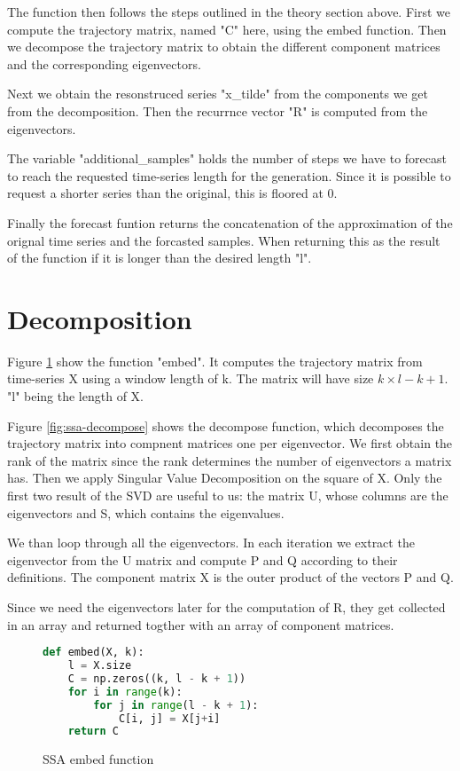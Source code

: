 The function then follows the steps outlined in the theory section above. First we compute the trajectory matrix, named "C" here, using the embed function. Then we decompose the trajectory matrix to obtain the different component matrices and the corresponding eigenvectors. 

Next we obtain the resonstruced series "x\_tilde" from the components we get from the decomposition. Then the recurrnce vector "R" is computed from the eigenvectors. 

The variable "additional\_samples" holds the number of steps we have to forecast to reach the requested time-series length for the generation. Since it is possible to request a shorter series than the original, this is floored at 0. 

Finally the forecast funtion returns the concatenation of the approximation of the orignal time series and the forcasted samples. When returning this as the result of the function if it is longer than the desired length "l". 

\section{Decomposition}

Figure \ref{fig:ssa-embed} show the function "embed". It computes the trajectory matrix from time-series X using a window length of k. The matrix will have size $k \times l-k+1$. "l" being the length of X. 

Figure \ref{fig:ssa-decompose} shows the decompose function, which decomposes the trajectory matrix into compnent matrices one per eigenvector.  We first obtain the rank of the matrix since the rank determines the number of eigenvectors a matrix has. Then we apply Singular Value Decomposition on the square of X. Only the first two result of the SVD are useful to us: the matrix U, whose columns are the eigenvectors and S, which contains the eigenvalues. 

We than loop through all the eigenvectors. In each iteration we extract the eigenvector from the U matrix and compute P and Q according to their definitions. The component matrix X is the outer product of the vectors P and Q. 

Since we need the eigenvectors later for the computation of R, they get collected in an array and returned togther with an array of component matrices. 

\begin{figure}
\begin{singlespace}
\begin{lstlisting}[language=Python]
def embed(X, k):
    l = X.size
    C = np.zeros((k, l - k + 1))
    for i in range(k):
        for j in range(l - k + 1):
            C[i, j] = X[j+i]
    return C
\end{lstlisting}
\end{singlespace}
\caption{SSA embed function}    
\label{fig:ssa-embed}
\end{figure}

